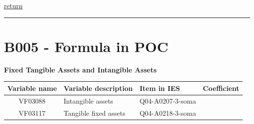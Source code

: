 \documentclass[]{book}
\begin{document}
\protect\hyperlink{assets}{return}

\begin{center}\rule{0.5\linewidth}{\linethickness}\end{center}

\hypertarget{b005---formula-in-poc}{%
\section{B005 - Formula in POC}\label{b005---formula-in-poc}}

\textbf{Fixed Tangible Assets and Intangible Assets}

\begin{longtable}[]{@{}cllc@{}}
\toprule
\begin{minipage}[b]{0.13\columnwidth}\centering
Variable name\strut
\end{minipage} & \begin{minipage}[b]{0.31\columnwidth}\raggedright
Variable description\strut
\end{minipage} & \begin{minipage}[b]{0.33\columnwidth}\raggedright
Item in IES\strut
\end{minipage} & \begin{minipage}[b]{0.11\columnwidth}\centering
Coefficient\strut
\end{minipage}\tabularnewline
\midrule
\endhead
\begin{minipage}[t]{0.13\columnwidth}\centering
VF03088\strut
\end{minipage} & \begin{minipage}[t]{0.31\columnwidth}\raggedright
Intangible assets\strut
\end{minipage} & \begin{minipage}[t]{0.33\columnwidth}\raggedright
Q04-A0207-3-soma\strut
\end{minipage} & \begin{minipage}[t]{0.11\columnwidth}\centering
1\strut
\end{minipage}\tabularnewline
\begin{minipage}[t]{0.13\columnwidth}\centering
VF03117\strut
\end{minipage} & \begin{minipage}[t]{0.31\columnwidth}\raggedright
Tangible fixed assets\strut
\end{minipage} & \begin{minipage}[t]{0.33\columnwidth}\raggedright
Q04-A0218-3-soma\strut
\end{minipage} & \begin{minipage}[t]{0.11\columnwidth}\centering

\end{minipage}
\end{longtable}
\end{document}
